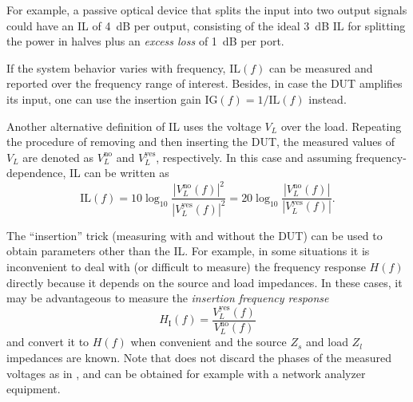 For example, a passive optical device that splits the input into two output signals could have an IL of 4~dB per output, consisting of the ideal 3~dB IL for splitting the power in halves plus an \emph{excess loss} of 1~dB per port.

If the system behavior varies with frequency, $\textrm{IL}(f)$ can be measured and reported over the frequency range of interest.
Besides, in case the DUT amplifies its input, one
can use the insertion gain $\textrm{IG}(f) = 1/\textrm{IL}(f)$ instead.

Another alternative definition of IL uses
the voltage $V_L$ over the load. Repeating the procedure
of removing and then inserting the DUT, the measured values of
$V_L$ are denoted as $V_L^{\textrm{no}}$ and $V_L^{\textrm{yes}}$,
respectively. In this case and assuming frequency-dependence, IL can be written as
\begin{equation}
\textrm{IL}(f)= 10 \log_{10} \frac {|V_L^{\textrm{no}}(f)|^2} {|V_L^{\textrm{yes}}(f)|^2}  =20 \log_{10} \frac {|V_L^{\textrm{no}}(f)|} {|V_L^{\textrm{yes}}(f)|}.
\label{eq:insertionLossVoltage}
\end{equation}

%

The ``insertion'' trick (measuring with and without the DUT) can be used to obtain parameters other than the IL. For example, in some situations it is inconvenient to
deal with (or difficult to measure) 
the frequency response $H(f)$ directly because it depends on 
the source and load impedances. In these cases, it may be advantageous
to measure the \emph{insertion frequency response} 
\begin{equation}
H_{\textrm{I}}(f) = \frac {V_L^{\textrm{yes}}(f)} {V_L^{\textrm{no}}(f)}
\label{eq:insertionFreqResponse}
\end{equation}
and convert it to $H(f)$ when convenient and the source $Z_s$ and load $Z_l$ impedances
are known. Note that  does not discard the phases of the measured voltages as in , and can be obtained for example with a network analyzer equipment. 

